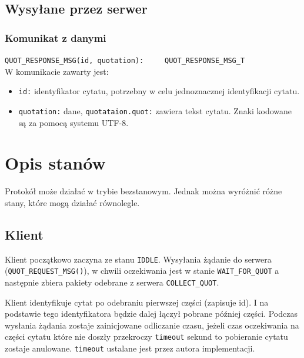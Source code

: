 \documentclass{article}
\begin{document}
\subsection{Wysyłane przez serwer}
\subsubsection{Komunikat z danymi}
\verb+QUOT_RESPONSE_MSG(id, quotation):     QUOT_RESPONSE_MSG_T+\\
W komunikacie zawarty jest:
\begin{itemize}
\item \verb+id:+ identyfikator cytatu, potrzebny w celu jednoznacznej identyfikacji cytatu.
\item \verb+quotation:+ dane, \verb+quotataion.quot:+ zawiera tekst cytatu.
Znaki kodowane są za pomocą systemu UTF-8.
\end{itemize}
\section{Opis stanów}
Protokół może działać w trybie bezstanowym. Jednak można
wyróżnić różne stany, które mogą działać równolegle.
\subsection{Klient}
Klient początkowo zaczyna ze stanu \verb+IDDLE+.
Wysyłania żądanie do serwera (\verb+QUOT_REQUEST_MSG()+), w chwili oczekiwania jest w
stanie \verb+WAIT_FOR_QUOT+ a następnie zbiera pakiety odebrane z serwera \verb+COLLECT_QUOT+.

Klient identyfikuje cytat po odebraniu pierwszej części (zapisuje id). I na podstawie tego
identyfikatora będzie dalej łączył pobrane później części.
Podczas wysłania żądania zostaje zainicjowane odliczanie czasu, jeżeli czas oczekiwania na części cytatu które nie doszły przekroczy 
\verb+timeout+ sekund to pobieranie cytatu zostaje anulowane. \verb+timeout+ ustalane jest przez autora implementacji.
\end{document}
